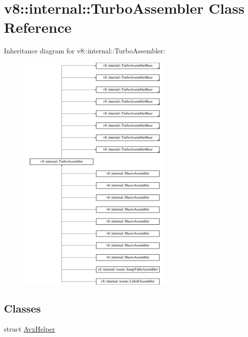 \hypertarget{classv8_1_1internal_1_1TurboAssembler}{}\section{v8\+:\+:internal\+:\+:Turbo\+Assembler Class Reference}
\label{classv8_1_1internal_1_1TurboAssembler}
Inheritance diagram for v8\+:\+:internal\+:\+:Turbo\+Assembler\+:\begin{figure}[H]
\begin{center}
\leavevmode
\includegraphics[height=12.000000cm]{classv8_1_1internal_1_1TurboAssembler}
\end{center}
\end{figure}
\subsection*{Classes}
\begin{DoxyCompactItemize}
\item 
struct \mbox{\hyperlink{structv8_1_1internal_1_1TurboAssembler_1_1AvxHelper}{Avx\+Helper}}
\end{DoxyCompactItemize}
